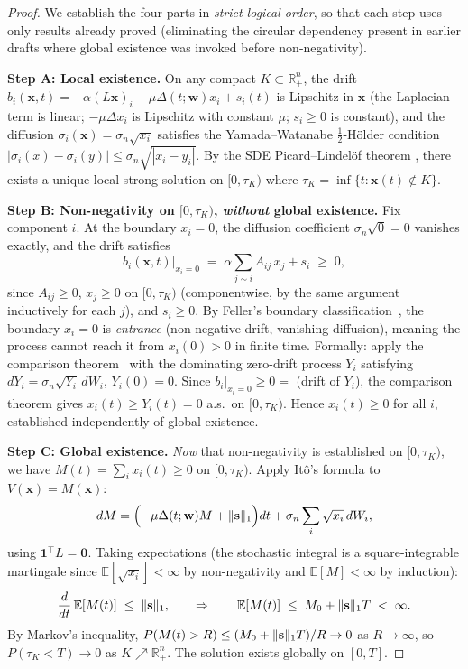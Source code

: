 \documentclass[review,12pt]{elsarticle}
\newcommand{\bfx}{\mathbf{x}}
\newcommand{\bfw}{\mathbf{w}}
\begin{document}
\begin{proof}
We establish the four parts in \emph{strict logical order}, so that each step
uses only results already proved (eliminating the circular dependency present
in earlier drafts where global existence was invoked before non-negativity).

\medskip
\noindent\textbf{Step A: Local existence.}
On any compact $K \subset \mathbb{R}^n_+$, the drift
$b_i(\bfx,t) = -\alpha(L\bfx)_i - \mu\Delta(t;\bfw)x_i + s_i(t)$
is Lipschitz in $\bfx$ (the Laplacian term is linear; $-\mu\Delta x_i$ is
Lipschitz with constant $\mu$; $s_i \geq 0$ is constant), and the diffusion
$\sigma_i(\bfx) = \sigma_n\sqrt{x_i}$ satisfies the Yamada--Watanabe
$\tfrac{1}{2}$-H\"older condition $|\sigma_i(x)-\sigma_i(y)| \leq
\sigma_n\sqrt{|x_i-y_i|}$.  By the SDE Picard--Lindel\"of theorem
\cite[Thm.~5.2.1]{oksendal2003stochastic}, there exists a unique local strong
solution on $[0,\tau_K)$ where $\tau_K = \inf\{t\!:\bfx(t)\notin K\}$.

\medskip
\noindent\textbf{Step B: Non-negativity on $[0,\tau_K)$, \emph{without} global
existence.}
Fix component $i$. At the boundary $x_i = 0$, the diffusion coefficient
$\sigma_n\sqrt{0}=0$ vanishes exactly, and the drift satisfies
\[
  b_i(\bfx,t)\big|_{x_i=0}
  \;=\; \alpha\!\sum_{j\sim i} A_{ij}\,x_j + s_i \;\geq\; 0,
\]
since $A_{ij}\geq 0$, $x_j \geq 0$ on $[0,\tau_K)$ (componentwise, by the
same argument inductively for each $j$), and $s_i \geq 0$.
By Feller's boundary classification~\cite{feller1951two}, the boundary $x_i=0$
is \emph{entrance} (non-negative drift, vanishing diffusion), meaning the
process cannot reach it from $x_i(0) > 0$ in finite time.
Formally: apply the comparison theorem~\cite[Thm.~IX.3.7]{revuzyor1999} with
the dominating zero-drift process $Y_i$ satisfying
$dY_i = \sigma_n\sqrt{Y_i}\,dW_i$, $Y_i(0) = 0$.
Since $b_i|_{x_i=0} \geq 0 =$ (drift of $Y_i$), the comparison theorem gives
$x_i(t) \geq Y_i(t) = 0$ a.s.\ on $[0,\tau_K)$.
Hence $x_i(t) \geq 0$ for all $i$, established independently of global existence.

\medskip
\noindent\textbf{Step C: Global existence.}
\emph{Now} that non-negativity is established on $[0,\tau_K)$, we have
$M(t) = \sum_i x_i(t) \geq 0$ on $[0,\tau_K)$.
Apply Itô's formula to $V(\bfx) = M(\bfx)$:
\[
  dM = \Bigl(-\mu\Delta(t;\bfw)M + \|{\bf s}\|_1\Bigr)dt
       + \sigma_n\sum_i \sqrt{x_i}\,dW_i,
\]
using $\mathbf{1}^\top L = \mathbf{0}$.  Taking expectations (the stochastic
integral is a square-integrable martingale since $\mathbb{E}[\sqrt{x_i}]
< \infty$ by non-negativity and $\mathbb{E}[M] < \infty$ by induction):
\[
  \frac{d}{dt}\,\mathbb{E}[M(t)] \;\leq\; \|{\bf s}\|_1,
  \qquad\Rightarrow\qquad
  \mathbb{E}[M(t)] \;\leq\; M_0 + \|{\bf s}\|_1 T \;<\; \infty.
\]
By Markov's inequality, $P(M(t) > R) \leq (M_0 + \|{\bf s}\|_1 T)/R \to 0$
as $R \to \infty$, so $P(\tau_K < T) \to 0$ as $K \nearrow \mathbb{R}^n_+$.
The solution exists globally on $[0,T]$.


\end{proof}
\end{document}
